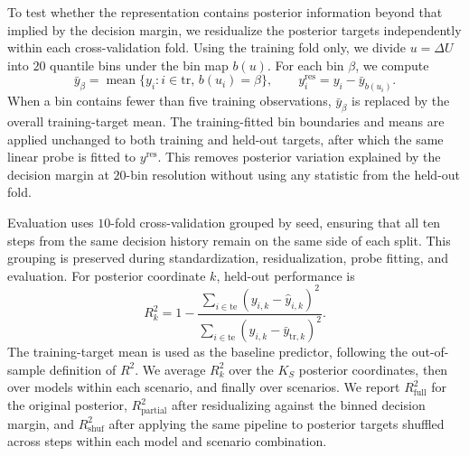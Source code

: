 \documentclass[letterpaper]{article} %
\begin{document}
To test whether the representation contains posterior information beyond that implied by the decision margin, we residualize the posterior targets independently within each cross-validation fold. Using the training fold only, we divide \(u=\Delta U\) into \(20\) quantile bins under the bin map \(b(u)\). For each bin \(\beta\), we compute
\[
\bar y_\beta=\operatorname{mean}\{y_i:i\in\mathrm{tr},\,b(u_i)=\beta\},
\qquad
y_i^{\mathrm{res}}=y_i-\bar y_{b(u_i)}.
\]
When a bin contains fewer than five training observations, \(\bar y_\beta\) is replaced by the overall training-target mean. The training-fitted bin boundaries and means are applied unchanged to both training and held-out targets, after which the same linear probe is fitted to \(y^{\mathrm{res}}\). This removes posterior variation explained by the decision margin at \(20\)-bin resolution without using any statistic from the held-out fold.

Evaluation uses \(10\)-fold cross-validation grouped by seed, ensuring that all ten steps from the same decision history remain on the same side of each split. This grouping is preserved during standardization, residualization, probe fitting, and evaluation. For posterior coordinate \(k\), held-out performance is
\[
R_k^2
=
1-
\frac{\sum_{i\in\mathrm{te}}
(y_{i,k}-\widehat y_{i,k})^2}
{\sum_{i\in\mathrm{te}}
(y_{i,k}-\bar y_{\mathrm{tr},k})^2}.
\]
The training-target mean is used as the baseline predictor, following the out-of-sample definition of \(R^2\). We average \(R_k^2\) over the \(K_S\) posterior coordinates, then over models within each scenario, and finally over scenarios. We report \(R^2_{\mathrm{full}}\) for the original posterior, \(R^2_{\mathrm{partial}}\) after residualizing against the binned decision margin, and \(R^2_{\mathrm{shuf}}\) after applying the same pipeline to posterior targets shuffled across steps within each model and scenario combination.
\end{document}
